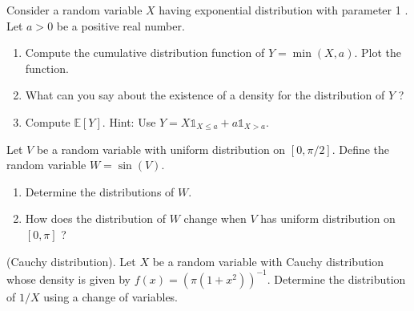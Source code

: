 \documentclass{article}
\begin{document}
\begin{Exercise}
  Consider a random variable $X$ having exponential distribution with parameter 1 . Let $a>0$ be a positive real number.
  \begin{enumerate}
    \item Compute the cumulative distribution function of $Y=\min (X, a)$. Plot the
          function.

    \item What can you say about the existence of a density for the distribution of $Y$ ?

    \item Compute $\mathbb{E}[Y]$. Hint: Use $Y=X \mathbb{1}_{X \leq a}+a
            \mathbb{1}_{X>a}$.
  \end{enumerate}
\end{Exercise}



\begin{Exercise} Let $V$ be a random variable with uniform distribution on $[0, \pi / 2]$. Define the random variable $W=\sin (V)$.
  \begin{enumerate}
    \item Determine the distributions of $W$.

    \item How does the distribution of $W$ change when $V$ has uniform distribution on
          $[0, \pi]$ ?

  \end{enumerate}
\end{Exercise}

\begin{Exercise} (Cauchy distribution). Let $X$ be a random variable with Cauchy distribution whose density is given by $f(x)=\left(\pi\left(1+x^{2}\right)\right)^{-1}$. Determine the distribution of $1 / X$ using a change of variables.
\end{Exercise}
\end{document}
